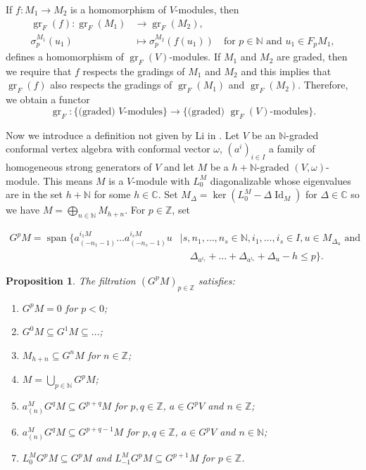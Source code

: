\documentclass[a4paper, 12pt, reqno]{amsart}
\newtheorem{proposition}[theorem]{Proposition}
\theoremstyle{remark}
\numberwithin{equation}{subsection}
\DeclareMathOperator{\Id}{Id}
\DeclareMathOperator{\gr}{gr}
\DeclareMathOperator{\vspan}{span}
\begin{document}
If $f: M_1 \to M_2$ is a homomorphism of $V$-modules, then
\begin{align*}
  \gr_F(f): \gr_F(M_1) &\to \gr_F(M_2), \\
  \sigma^{M_1}_p(u_1) &\mapsto \sigma^{M_2}_p(f(u_1)) \quad \text{for }p \in \mathbb{N}\text{ and }u_1 \in F_pM_1,
\end{align*}
defines a homomorphism of $\gr_F(V)$-modules.
If $M_1$ and $M_2$ are graded, then we require that $f$ respects the gradings of $M_1$ and $M_2$ and this implies that $\gr_F(f)$ also respects the gradings of $\gr_F(M_1)$ and $\gr_F(M_2)$.
Therefore, we obtain a functor
\begin{equation*}
  \gr_F: \{\text{(graded) $V$-modules}\} \to \{\text{(graded) $\gr_F(V)$-modules}\}.
\end{equation*}

Now we introduce a definition not given by Li in \cite{li_vertex_2004}.
Let $V$ be an $\mathbb{N}$-graded conformal vertex algebra with conformal vector $\omega$, $(a^i)_{i \in I}$ a family of homogeneous strong generators of $V$ and let $M$ be a $h + \mathbb{N}$-graded $(V, \omega)$-module.
This means $M$ is a $V$-module with $L_0^M$ diagonalizable whose eigenvalues are in the set $h + \mathbb{N}$ for some $h \in \mathbb{C}$.
Set $M_\Delta = \ker(L^M_0 - \Delta\Id_M)$ for $\Delta \in \mathbb{C}$ so we have $M = \bigoplus_{n \in \mathbb{N}}M_{h + n}$.
For $p \in \mathbb{Z}$, set

\begin{equation*}
  \begin{split}
    G^pM = \vspan\{a^{i_1M}_{(-n_1 - 1)}\dots a^{i_sM}_{(-n_s - 1)}u &\mid s, n_1, \dots, n_s \in \mathbb{N}, i_1, \dots, i_s \in I, u \in M_{\Delta_u} \text{ and }\\
    &\quad \Delta_{a^{i_1}} + \dots + \Delta_{a^{i_s}} + \Delta_u - h \le p\}.
  \end{split}
\end{equation*}

\begin{proposition}
  \label{prp:13}
  The filtration $(G^pM)_{p \in \mathbb{Z}}$ satisfies:
  \begin{enumerate}
  \item $G^pM = 0$ for $p < 0$;
  \item $G^0M \subseteq G^1M \subseteq \dots$;
  \item $M_{h + n} \subseteq G^nM$ for $n \in \mathbb{Z}$;
  \item $M = \bigcup_{p \in \mathbb{N}}G^pM$;
  \item $a^M_{(n)}G^qM \subseteq G^{p + q}M$ for $p, q \in \mathbb{Z}$, $a \in G^pV$ and $n \in \mathbb{Z}$;
  \item $a^M_{(n)}G^qM \subseteq G^{p + q - 1}M$ for $p, q \in \mathbb{Z}$, $a \in G^pV$ and $n \in \mathbb{N}$;
  \item $L^M_0G^pM \subseteq G^pM$ and $L^M_{-1}G^pM \subseteq G^{p + 1}M$ for $p \in \mathbb{Z}$.
  \end{enumerate}
\end{proposition}
\end{document}
